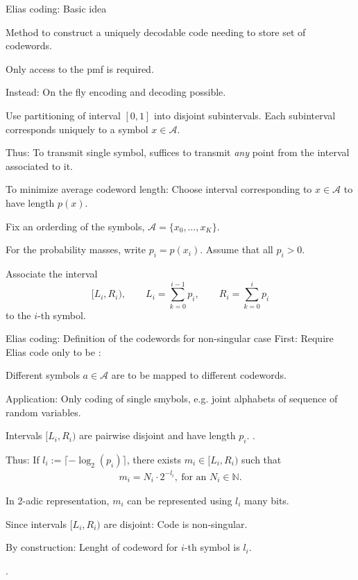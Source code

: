 \begin{frame}{Elias coding: Basic idea}
\bit 
\item Method to construct a uniquely decodable code  needing to store set of codewords.
\item Only access to the pmf is required. 
\item Instead: On the fly encoding and decoding possible.
\item {} Use partitioning of interval $[0,1]$ into disjoint subintervals. Each subinterval corresponds 
uniquely to a symbol $x\in\mathcal{A}$. 
\item [\iarrow] Thus: To transmit single symbol, suffices to transmit \textit{any} point from the interval associated to it.  
\item To minimize average codeword length: Choose interval corresponding to $x\in\mathcal{A}$ to have length $p(x)$. 
\eit
\vspace{-0.1cm}
\bit
\item Fix an orderding of the symbols, $\mathcal{A}=\{x_0,\dots,x_K\}$.
\item For the probability masses, write $p_i=p(x_i)$. Assume that all $p_i>0$.   
\item Associate the interval
\[
[L_i,R_i), \qquad L_i=\sum_{k=0}^{i-1}p_i,\qquad R_i=\sum_{k=0}^{i}p_i
\] 
to the $i$-th symbol. 
\eit
\end{frame}


\begin{frame}{Elias coding: Definition of the codewords for non-singular case}
First: Require Elias code only to be : 
\bit %
\item Different symbols $a\in\mathcal{A}$ are to be mapped to different codewords. 
\item Application: Only coding of single smybols, e.g. joint alphabets of sequence of random variables.
\eit
\vspace{-0.1cm}
\bit
\item Intervals $[L_i,R_i)$ are pairwise disjoint and have length $p_i$. .
\item Thus: If  ${l}_i:=\lceil-\log_2(p_i)\rceil$,
there exists $m_i\in [L_i,R_i)$ such that 
\begin{align}\label{Propm}
m_i=N_i\cdot 2^{-l_i},\: \text{for an $N_i\in\mathbb{N}$}.
\end{align}  
\item In 2-adic representation, $m_i$ can be represented using ${l}_i$ many bits.
\item[\iarrow]
\item Since intervals $[L_i,R_i)$ are disjoint: Code is non-singular.
\item By construction: Lenght of codeword for $i$-th symbol is $l_i$. 
\item[\iarrow] . 
\eit 

\end{frame}

